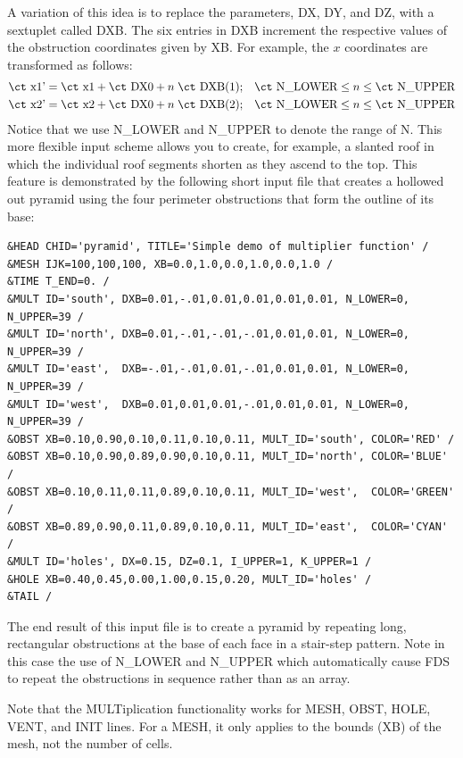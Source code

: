 \documentclass[11pt]{book}
\begin{document}
A variation of this idea is to replace the parameters, {\ct DX}, {\ct DY}, and {\ct DZ}, with a sextuplet called {\ct DXB}. The six entries in {\ct DXB} increment the respective values of the obstruction coordinates given by {\ct XB}. For example, the $x$ coordinates are transformed as follows:
\begin{eqnarray*}  \hbox{\ct x1'} = \hbox{\ct x1} + \hbox{\ct DX0} + n \; \hbox{\ct DXB(1)}  &;& \hbox{\ct N\_LOWER} \le n \le \hbox{\ct N\_UPPER} \\
                   \hbox{\ct x2'} = \hbox{\ct x2} + \hbox{\ct DX0} + n \; \hbox{\ct DXB(2)}  &;& \hbox{\ct N\_LOWER} \le n \le \hbox{\ct N\_UPPER}
\end{eqnarray*}
Notice that we use {\ct N\_LOWER} and {\ct N\_UPPER} to denote the range of {\ct N}. This more flexible input scheme allows you to create, for example, a slanted roof in which the individual roof segments shorten as they ascend to the top. This feature is demonstrated by the following short input file that creates a hollowed out pyramid using the four perimeter obstructions that form the outline of its base:
\begin{lstlisting}
&HEAD CHID='pyramid', TITLE='Simple demo of multiplier function' /
&MESH IJK=100,100,100, XB=0.0,1.0,0.0,1.0,0.0,1.0 /
&TIME T_END=0. /
&MULT ID='south', DXB=0.01,-.01,0.01,0.01,0.01,0.01, N_LOWER=0, N_UPPER=39 /
&MULT ID='north', DXB=0.01,-.01,-.01,-.01,0.01,0.01, N_LOWER=0, N_UPPER=39 /
&MULT ID='east',  DXB=-.01,-.01,0.01,-.01,0.01,0.01, N_LOWER=0, N_UPPER=39 /
&MULT ID='west',  DXB=0.01,0.01,0.01,-.01,0.01,0.01, N_LOWER=0, N_UPPER=39 /
&OBST XB=0.10,0.90,0.10,0.11,0.10,0.11, MULT_ID='south', COLOR='RED' /
&OBST XB=0.10,0.90,0.89,0.90,0.10,0.11, MULT_ID='north', COLOR='BLUE' /
&OBST XB=0.10,0.11,0.11,0.89,0.10,0.11, MULT_ID='west',  COLOR='GREEN' /
&OBST XB=0.89,0.90,0.11,0.89,0.10,0.11, MULT_ID='east',  COLOR='CYAN' /
&MULT ID='holes', DX=0.15, DZ=0.1, I_UPPER=1, K_UPPER=1 /
&HOLE XB=0.40,0.45,0.00,1.00,0.15,0.20, MULT_ID='holes' /
&TAIL /
\end{lstlisting}
The end result of this input file is to create a pyramid by repeating long, rectangular obstructions at the base of each face in a stair-step pattern. Note in this case the use of {\ct N\_LOWER} and {\ct N\_UPPER} which automatically cause FDS to repeat the obstructions in sequence rather than as an array.

Note that the {\ct MULT}iplication functionality works for {\ct MESH}, {\ct OBST}, {\ct HOLE}, {\ct VENT}, and {\ct INIT} lines. For a {\ct MESH}, it only applies to the bounds ({\ct XB}) of the mesh, not the number of cells.
\end{document}
